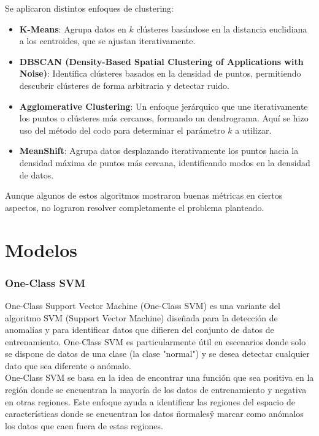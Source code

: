 Se aplicaron distintos enfoques de clustering:
\begin{itemize}
    \item \textbf{K-Means}: Agrupa datos en \(k\) clústeres basándose en la distancia euclidiana a los centroides, que se ajustan iterativamente.
    
    \item \textbf{DBSCAN (Density-Based Spatial Clustering of Applications with Noise)}: Identifica clústeres basados en la densidad de puntos, permitiendo descubrir clústeres de forma arbitraria y detectar ruido.
    \item \textbf{Agglomerative Clustering}: Un enfoque jerárquico que une iterativamente los puntos o clústeres más cercanos, formando un dendrograma.  Aquí se hizo uso del método del codo para determinar el parámetro \(k\) a utilizar.
    
    \item \textbf{MeanShift}: Agrupa datos desplazando iterativamente los puntos hacia la densidad máxima de puntos más cercana, identificando modos en la densidad de datos.
\end{itemize}

Aunque algunos de estos algoritmos mostraron buenas métricas en ciertos aspectos, no lograron resolver completamente el problema planteado. 

\section{Modelos}

\subsubsection{One-Class SVM}

One-Class Support Vector Machine (One-Class SVM) es una variante del algoritmo SVM (Support Vector Machine) diseñada para la detección de anomalías y para identificar datos que difieren del conjunto de datos de entrenamiento. One-Class SVM es particularmente útil en escenarios donde solo se dispone de datos de una clase (la clase "normal") y se desea detectar cualquier dato que sea diferente o anómalo.\\

One-Class SVM se basa en la idea de encontrar una función que sea positiva en la región donde se encuentran la mayoría de los datos de entrenamiento y negativa en otras regiones. Este enfoque ayuda a identificar las regiones del espacio de características donde se encuentran los datos \"normales\" y marcar como anómalos los datos que caen fuera de estas regiones.\\

